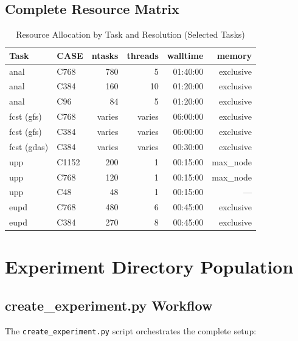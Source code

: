 \documentclass[11pt,letterpaper]{article}
\begin{document}
\subsection{Complete Resource Matrix}

\begin{table}[H]
\centering
\caption{Resource Allocation by Task and Resolution (Selected Tasks)}
\label{tab:resource-matrix}
\small
\begin{tabular}{@{}llrrrr@{}}
\toprule
\textbf{Task} & \textbf{CASE} & \textbf{ntasks} & \textbf{threads} & \textbf{walltime} & \textbf{memory} \\
\midrule
anal & C768 & 780 & 5 & 01:40:00 & exclusive \\
anal & C384 & 160 & 10 & 01:20:00 & exclusive \\
anal & C96 & 84 & 5 & 01:20:00 & exclusive \\
\midrule
fcst (gfs) & C768 & varies & varies & 06:00:00 & exclusive \\
fcst (gfs) & C384 & varies & varies & 06:00:00 & exclusive \\
fcst (gdas) & C384 & varies & varies & 00:30:00 & exclusive \\
\midrule
upp & C1152 & 200 & 1 & 00:15:00 & max\_node \\
upp & C768 & 120 & 1 & 00:15:00 & max\_node \\
upp & C48 & 48 & 1 & 00:15:00 & --- \\
\midrule
eupd & C768 & 480 & 6 & 00:45:00 & exclusive \\
eupd & C384 & 270 & 8 & 00:45:00 & exclusive \\
\bottomrule
\end{tabular}
\end{table}


\section{Experiment Directory Population}

\subsection{create\_experiment.py Workflow}

The \texttt{create\_experiment.py} script orchestrates the complete setup:
\end{document}
